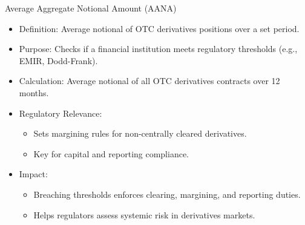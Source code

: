 \documentclass[handout, aspectratio=169]{beamer}
\begin{document}
\begin{frame}{Average Aggregate Notional Amount (AANA)}
  \begin{itemize}
    \item Definition: Average notional of OTC derivatives positions over a set period.
    \item Purpose: Checks if a financial institution meets regulatory thresholds (e.g., EMIR, Dodd-Frank).
    \item Calculation: Average notional of all OTC derivatives contracts over 12 months.
    \item Regulatory Relevance:
      \begin{itemize}
        \item Sets margining rules for non-centrally cleared derivatives.
        \item Key for capital and reporting compliance.
      \end{itemize}
    \item Impact:
      \begin{itemize}
        \item Breaching thresholds enforces clearing, margining, and reporting duties.
        \item Helps regulators assess systemic risk in derivatives markets.
      \end{itemize}
  \end{itemize}
\end{frame}
\end{document}
